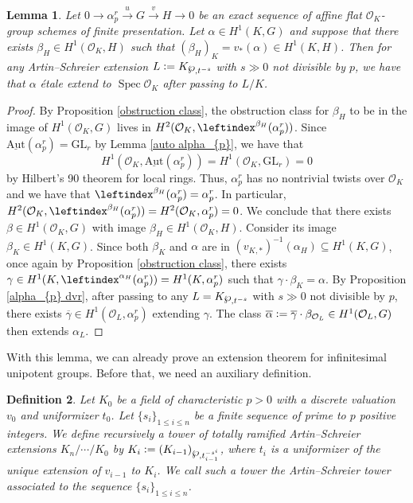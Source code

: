 \documentclass[a4paper,english,12pt]{amsart}
\newtheorem{definition}{Definition}[section]
\newtheorem{lemma}[definition]{Lemma}
\numberwithin{equation}{section}
\newcommand{\defeq}{\vcentcolon=}
\DeclareMathOperator{\Spec}{Spec}
\renewcommand{\leq}{\leqslant}
\renewcommand{\wp}{\ensuremath\raisebox{\depth}{$\mathchar"17D$}}
\renewcommand{\_}{\rule{0.25cm}{0.4pt}}
\begin{document}
\begin{lemma}\label{seq alpha_{p}}
    Let $0\to \alpha_{p}^{r}\xrightarrow{u} G\xrightarrow{v} H\to 0$ be an exact sequence of affine flat $\mathcal{O}_{K}$-group schemes of finite presentation. Let $\alpha\in H^{1}(K,G)$ and suppose that there exists $\beta_{H}\in H^{1}(\mathcal{O}_{K},H)$ such that $(\beta_{H})_{K}=v_{\ast}(\alpha)\in H^{1}(K,H)$. Then for any Artin--Schreier extension $L\defeq K_{\wp,t^{-s}}$ with $s\gg 0$ not divisible by $p$, we have that $\alpha$ étale extend to $\Spec \mathcal{O}_{K}$ after passing to $L/K$.
\end{lemma}
\begin{proof}
    By Proposition \ref{obstruction class}, the obstruction class for $\beta_{H}$ to be in the image of $H^{1}(\mathcal{O}_{K},G)$ lives in $H^{2}(\mathcal{O}_{K},\leftindex^{\beta_{H}}{(\alpha_{p}^{r})})$. Since $\underline{\text{Aut}}(\alpha_{p}^{r})=\text{GL}_{r}$ by Lemma \ref{auto alpha_{p}}, we have that
    \[
    H^{1}(\mathcal{O}_{K},\underline{\text{Aut}}(\alpha_{p}^{r}))=H^{1}(\mathcal{O}_{K},\text{GL}_{r})=0
    \]
    by Hilbert's 90 theorem for local rings. Thus, $\alpha_{p}^{r}$ has no nontrivial twists over $\mathcal{O}_{K}$ and we have that \phantom{}$\leftindex^{\beta_{H}}{(\alpha_{p}^{r})}=\alpha_{p}^{r}$.
    In particular, $H^{2}(\mathcal{O}_{K},\leftindex^{\beta_{H}}{(\alpha_{p}^{r})})=H^{2}(\mathcal{O}_{K},\alpha_{p}^{r})=0$. We conclude that there exists $\beta\in H^{1}(\mathcal{O}_{K},G)$ with image $\beta_{H}\in H^{1}(\mathcal{O}_{K},H)$. 
    Consider its image $\beta_{K}\in H^{1}(K,G)$. Since both $\beta_{K}$ and $\alpha$ are in $(v_{K,\ast})^{-1}(\alpha_{H})\subseteq H^{1}(K,G)$, once again by Proposition \ref{obstruction class}, there exists $\gamma\in H^{1}(K,\leftindex^{\alpha_{H}}{(\alpha_{p}^{r})})=H^{1}(K,\alpha_{p}^{r})$ such that $\gamma\cdot \beta_{K}=\alpha$. By Proposition \ref{alpha_{p} dvr}, after passing to any $L=K_{\wp, t^{-s}}$ with $s\gg 0$ not divisible by $p$, there exists $\overline{\gamma}\in H^{1}(\mathcal{O}_{L},\alpha_{p}^{r})$ extending $\gamma$. The class $\overline{\alpha}\defeq\overline{\gamma}\cdot\beta_{\mathcal{O}_{L}}\in H^{1}(\mathcal{O}_{L},G)$ then extends $\alpha_{L}$. 
\end{proof}

With this lemma, we can already prove an extension theorem for infinitesimal unipotent groups. Before that, we need an auxiliary definition.

\begin{definition}\label{tower AS}
    Let $K_{0}$ be a field of characteristic $p>0$ with a discrete valuation $v_{0}$ and uniformizer $t_{0}$. Let $\{s_{i}\}_{1\leq i\leq n}$ be a finite sequence of prime to $p$ positive integers. We define recursively a tower of totally ramified Artin--Schreier extensions $K_{n}/\cdots/K_{0}$ by $K_{i}\defeq (K_{i-1})_{\wp, t_{i-1}^{-s^{i}}}$, where $t_{i}$ is a uniformizer of the unique extension of $v_{i-1}$ to $K_{i}$. We call such a tower the Artin--Schreier tower associated to the sequence $\{s_{i}\}_{1\leq i\leq n}$.
\end{definition}
\end{document}
